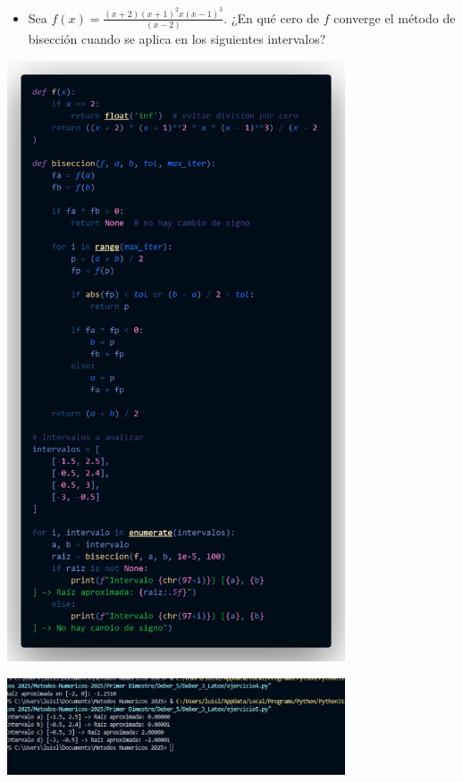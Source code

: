 \documentclass[12pt]{article}
\begin{document}
\begin{itemize}
    \item {Sea \( f(x) = \frac{(x + 2)(x + 1)^2 x (x - 1)^3}{(x - 2)} \). 
    ¿En qué cero de \( f \) converge el método de bisección cuando se aplica en los siguientes intervalos?
    }
    \end{itemize}

\begin{minipage}{0.75\textwidth}
    \raggedleft
    \includegraphics[width=0.75\textwidth]{inFiles/Figures/cd8.png}
\end{minipage}

\vspace{0.5cm}

\begin{minipage}{0.75\textwidth}
    \raggedleft
    \includegraphics[width=0.75\textwidth]{inFiles/Figures/ejec6.jpg}
\end{minipage}
\end{document}
